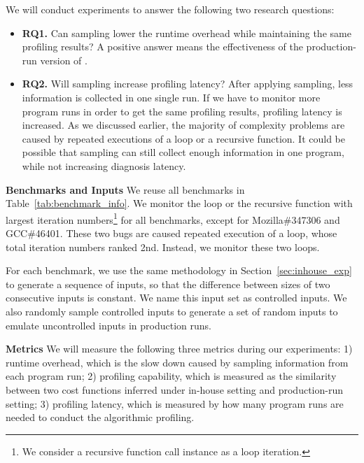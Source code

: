 We will conduct experiments to answer the following two research questions:

\begin{itemize}
\item {\bf RQ1.} 
Can sampling lower the runtime overhead while maintaining the same profiling results? 
A positive answer means the effectiveness of the production-run version of \Tool. 

\item {\bf RQ2.} 
Will sampling increase profiling latency? 
After applying sampling, less information is collected in one single run. 
If we have to monitor more program runs in order to get the same profiling results,
profiling latency is increased.
As we discussed earlier, the majority of complexity problems are caused 
by repeated executions of a loop or a recursive function.
 It could be possible that sampling can still collect enough information in one program, 
while not increasing diagnosis latency. 


\end{itemize}

\noindent\textbf{Benchmarks and Inputs}
We reuse all benchmarks in Table~\ref{tab:benchmark_info}.
We monitor the loop or the recursive function with largest iteration 
numbers\footnote{We consider a recursive function call instance as a loop iteration.} 
for all benchmarks,
except for Mozilla\#347306 and GCC\#46401. 
These two bugs are caused repeated execution of a loop, 
whose total iteration numbers ranked 2nd. 
Instead, we monitor these two loops.

For each benchmark, 
we use the same methodology in Section~\ref{sec:inhouse_exp} 
to generate a sequence of inputs, 
so that the difference between sizes of two consecutive inputs is constant.
We name this input set as controlled inputs.
We also randomly sample controlled inputs to generate a set of random 
inputs to emulate uncontrolled inputs in production runs.    

\noindent\textbf{Metrics}
We will measure the following three metrics during our experiments:
1) runtime overhead, which is the slow down caused 
by sampling information from each program run;
2) profiling capability, which is measured as the similarity between two cost functions 
inferred under in-house setting and production-run setting; 
3) profiling latency, which is measured by how many program 
runs are needed to conduct the algorithmic profiling. 





